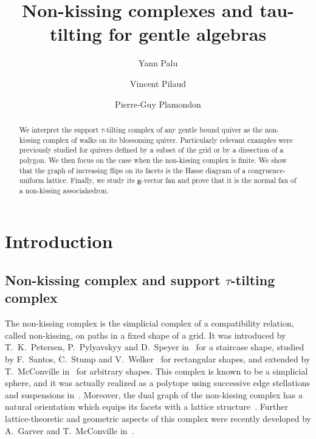\documentclass{amsart}
\title{Non-kissing complexes and tau-tilting for gentle algebras}
\author{Yann Palu}
\author{Vincent Pilaud}
\author{Pierre-Guy Plamondon}
\theoremstyle{definition}
\renewcommand{\b}[1]{\mathbf{#1}} %
\begin{document}
\begin{abstract}
We interpret the support $\tau$-tilting complex of any gentle bound quiver as the non-kissing complex of walks on its blossoming quiver.
Particularly relevant examples were previously studied for quivers defined by a subset of the grid or by a dissection of a polygon.
We then focus on the case when the non-kissing complex is finite.
We show that the graph of increasing flips on its facets is the Hasse diagram of a congruence-uniform lattice.
Finally, we study its $\b{g}$-vector fan and prove that it is the normal fan of a non-kissing associahedron.
\end{abstract}


\maketitle

\vspace*{.3cm}
\tableofcontents

\vspace*{-.9cm}
\enlargethispage{.4cm}


\newpage
\section*{Introduction}

\subsection*{Non-kissing complex and support $\tau$-tilting complex}

The non-kissing complex is the simplicial complex of a compatibility relation, called non-kissing, on paths in a fixed shape of a grid.
It was introduced by T.~K.~Petersen, P.~Pylyavskyy and D.~Speyer in~\cite{PetersenPylyavskyySpeyer} for a staircase shape, studied by F.~Santos, C.~Stump and V.~Welker~\cite{SantosStumpWelker} for rectangular shapes, and extended by T.~McConville in~\cite{McConville} for arbitrary shapes.
This complex is known to be a simplicial sphere, and it was actually realized as a polytope using successive edge stellations and suspensions in~\cite[Sect.~4]{McConville}.
Moreover, the dual graph of the non-kissing complex has a natural orientation which equips its facets with a lattice structure~\cite[Thm. 1.1, Sect.~5--8]{McConville}.
Further lattice-theoretic and geometric aspects of this complex were recently developed by A.~Garver and T.~McConville in~\cite{GarverMcConville-grid}.
\end{document}
